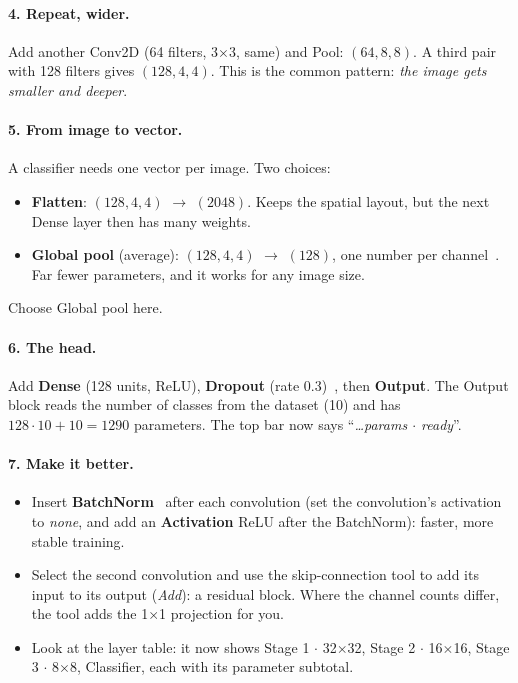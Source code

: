\documentclass[11pt,a4paper]{article}
\newcommand{\ui}[1]{\textbf{\textsf{#1}}}
\newcommand{\shape}[1]{$(#1)$}
\begin{document}
\paragraph{4. Repeat, wider.}
Add another Conv2D (64 filters, 3$\times$3, same) and Pool: \shape{64, 8, 8}. A third pair with 128 filters gives \shape{128, 4, 4}.
This is the common pattern: \emph{the image gets smaller and deeper}.

\paragraph{5. From image to vector.}
A classifier needs one vector per image. Two choices:
\begin{itemize}
  \item \ui{Flatten}: \shape{128, 4, 4} $\rightarrow$ \shape{2048}. Keeps the spatial layout, but the next Dense layer then has many weights.
  \item \ui{Global pool} (average): \shape{128, 4, 4} $\rightarrow$ \shape{128}, one number per channel~\cite{lin2013nin}. Far fewer
        parameters, and it works for any image size.
\end{itemize}
Choose Global pool here.

\paragraph{6. The head.}
Add \ui{Dense} (128 units, ReLU), \ui{Dropout} (rate 0.3)~\cite{hinton2012dropout,srivastava2014dropout}, then \ui{Output}. The
Output block reads the number of classes from the dataset (10) and has $128\cdot10+10=1290$ parameters. The top bar now says
``\emph{\ldots params $\cdot$ ready}''.

\paragraph{7. Make it better.}
\begin{itemize}
  \item Insert \ui{BatchNorm}~\cite{ioffe2015batchnorm} after each convolution (set the convolution's activation to \emph{none}, and add
        an \ui{Activation} ReLU after the BatchNorm): faster, more stable training.
  \item Select the second convolution and use the skip-connection tool to add its input to its output (\emph{Add}): a residual block.
        Where the channel counts differ, the tool adds the 1$\times$1 projection for you.
  \item Look at the layer table: it now shows Stage 1 $\cdot$ 32$\times$32, Stage 2 $\cdot$ 16$\times$16, Stage 3 $\cdot$ 8$\times$8,
        Classifier, each with its parameter subtotal.
\end{itemize}
\end{document}
